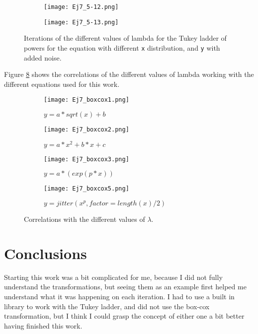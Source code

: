 \documentclass{article}
\begin{document}
\begin{figure}[]
\begin{subfigure}{.23\textwidth}
  \centering
  \texttt{[image: Ej7\_5-12.png]}  
  \caption{ }
  \label{sb11-12}
\end{subfigure}
\newline
\begin{subfigure}{1\textwidth}
  \centering
  \texttt{[image: Ej7\_5-13.png]}  
  \caption{ }
  \label{sb11-13}
\end{subfigure}
\caption{Iterations of the different values of lambda for the Tukey ladder of powers for the equation with different \texttt{x} distribution, and \texttt{y} with added noise.}
\label{fig11}
\end{figure}



\clearpage

Figure \ref{fig12} shows the correlations of the different values of lambda working with the different equations used for this work.\\

\begin{figure}[]
\begin{subfigure}{.5\textwidth}
  \centering
  \texttt{[image: Ej7\_boxcox1.png]}  
  \caption{$y = a * sqrt(x) + b$ }
  \label{sb12-1}
\end{subfigure}
\begin{subfigure}{.5\textwidth}
  \centering
  \texttt{[image: Ej7\_boxcox2.png]}  
  \caption{$y = a*x^2 + b*x + c$}
  \label{sb12-2}
\end{subfigure}
\newline
\begin{subfigure}{.5\textwidth}
  \centering
  \texttt{[image: Ej7\_boxcox3.png]}  
  \caption{$y = a * (exp(p * x))  $}
  \label{sb12-3}
\end{subfigure}
\begin{subfigure}{.5\textwidth}
  \centering
  \texttt{[image: Ej7\_boxcox5.png]}  
  \caption{$y = jitter(x^p, factor = length(x)/2)  $}
  \label{sb12-4}
\end{subfigure}
\caption{Correlations with the different values of $\lambda$.}
\label{fig12}
\end{figure}


\section{Conclusions}


Starting this work was a bit complicated for me, because I did not fully understand the transformations, but seeing them as an example first helped me understand what it was happening on each iteration. I had to use a built in library to work with the Tukey ladder, and did not use the box-cox transformation, but I think I could grasp the concept of either one a bit better having finished this work.\\






 
\end{document}

